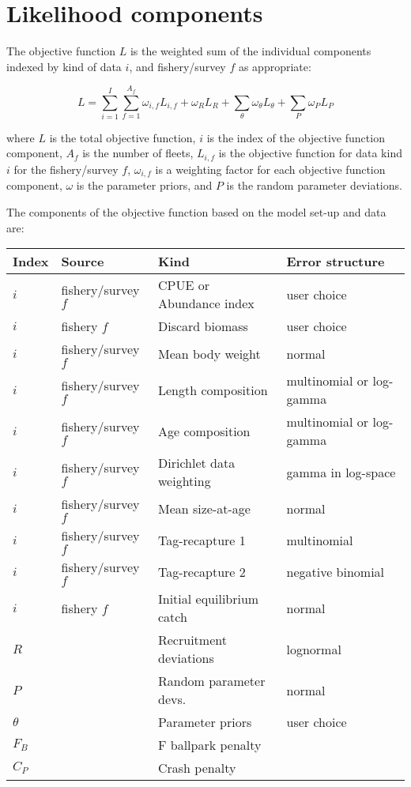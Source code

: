 \section{Likelihood components}

The objective function $L$ is the weighted sum of the individual components indexed by kind of data $i$, and fishery/survey $f$ as appropriate:

\begin{equation}
	L = \sum_{i=1}^{I}\sum_{f=1}^{A_f}\omega_{i,f} L_{i,f}+\omega_R L_R + \sum_{\theta}^{}\omega_\theta L_\theta + \sum_{P}^{}\omega_P L_P
\end{equation}

where $L$ is the total objective function, $i$ is the index of the objective function component, $A_f$ is the number of fleets, $L_{i,f}$ is the objective function for data kind $i$ for the fishery/survey $f$, $\omega_{i,f}$ is a weighting factor for each objective function component, $\omega$ is the parameter priors, and $P$ is the random parameter deviations.

The components of the objective function based on the model set-up and data are: 

\begin{longtable}{p{1cm} p{3.5cm} p{5.5cm} p{4.75cm}}
	\hline
	Index & Source & Kind & Error structure\Tstrut\Bstrut\\
	\hline	
	$i$ & fishery/survey $f$ & CPUE or Abundance index & user choice \Tstrut\\
	$i$ & fishery $f$        & Discard biomass         & user choice \Tstrut\\
	$i$ & fishery/survey $f$ & Mean body weight        & normal \Tstrut\\
	$i$ & fishery/survey $f$ & Length composition      & multinomial or log-gamma\Tstrut\\
	$i$ & fishery/survey $f$ & Age composition         & multinomial or log-gamma\Tstrut\\
	$i$ & fishery/survey $f$ & Dirichlet data weighting& gamma in log-space\Tstrut\\
	$i$ & fishery/survey $f$ & Mean size-at-age        & normal \Tstrut\\
	$i$ & fishery/survey $f$ & Tag-recapture 1         & multinomial \Tstrut\\
	$i$ & fishery/survey $f$ & Tag-recapture 2         & negative binomial\Tstrut\\
	$i$ & fishery $f$        & Initial equilibrium catch & normal \Tstrut\\
	$R$ & 					 & Recruitment deviations  & lognormal \Tstrut\\
	$P$ & 					 & Random parameter devs.  & normal \Tstrut\\
	$\theta$ & 				 & Parameter priors	       & user choice\Tstrut\\
	$F_B$ & 				 & F ballpark penalty	   &  \Tstrut\\
	$C_P$ &				     & Crash penalty           &  \Tstrut\Bstrut\\
	\hline
\end{longtable}

